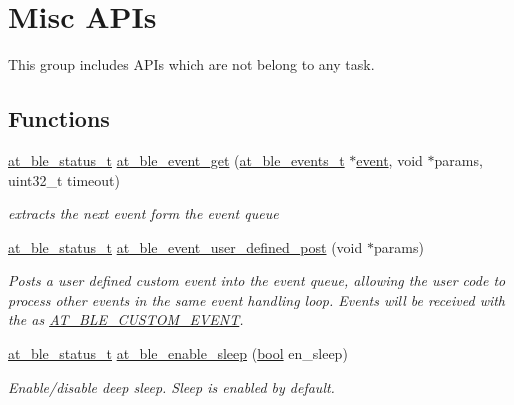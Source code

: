 \hypertarget{group__misc__group}{}\section{Misc A\+P\+Is}
\label{group__misc__group}


This group includes A\+P\+Is which are not belong to any task.  


\subsection*{Functions}
\begin{DoxyCompactItemize}
\item 
\mbox{\hyperlink{group__error__codes__group_ga3b1db9b95feb157b3c188ca27fe76988}{at\+\_\+ble\+\_\+status\+\_\+t}} \mbox{\hyperlink{group__misc__group_ga80845db83e539aacd58d93f598805c64}{at\+\_\+ble\+\_\+event\+\_\+get}} (\mbox{\hyperlink{at__ble__api_8h_a3324640b95f33169515f89738ed5baeb}{at\+\_\+ble\+\_\+events\+\_\+t}} $\ast$\mbox{\hyperlink{ble__manager_8c_a7f4fdb26d292561b95cac0359f75d1e3}{event}}, void $\ast$params, uint32\+\_\+t timeout)
\begin{DoxyCompactList}\small\item\em extracts the next event form the event queue \end{DoxyCompactList}\item 
\mbox{\hyperlink{group__error__codes__group_ga3b1db9b95feb157b3c188ca27fe76988}{at\+\_\+ble\+\_\+status\+\_\+t}} \mbox{\hyperlink{group__misc__group_gadc0a033c5b84eee9ffd4c6c394be2520}{at\+\_\+ble\+\_\+event\+\_\+user\+\_\+defined\+\_\+post}} (void $\ast$params)
\begin{DoxyCompactList}\small\item\em Posts a user defined custom event into the event queue, allowing the user code to process other events in the same event handling loop. Events will be received with the as \mbox{\hyperlink{at__ble__api_8h_a3324640b95f33169515f89738ed5baeba2c2e832242a618195900984a4abec3e9}{A\+T\+\_\+\+B\+L\+E\+\_\+\+C\+U\+S\+T\+O\+M\+\_\+\+E\+V\+E\+NT}}. \end{DoxyCompactList}\item 
\mbox{\hyperlink{group__error__codes__group_ga3b1db9b95feb157b3c188ca27fe76988}{at\+\_\+ble\+\_\+status\+\_\+t}} \mbox{\hyperlink{group__misc__group_gaba8b09c4f8f3b40e4eb84a38187b1f58}{at\+\_\+ble\+\_\+enable\+\_\+sleep}} (\mbox{\hyperlink{group__group__sam0__utils_ga97a80ca1602ebf2303258971a2c938e2}{bool}} en\+\_\+sleep)
\begin{DoxyCompactList}\small\item\em Enable/disable deep sleep. Sleep is enabled by default. \end{DoxyCompactList}\end{DoxyCompactItemize}


